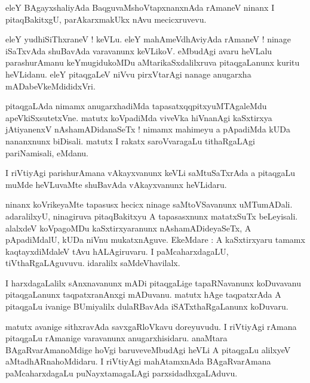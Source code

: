 \documentclass{article}
\begin{document}
\begin{mn}
eleY BAgayxshaliyAda BaqguvaMshoVtapxnanxnAda rAmaneV ninanx I pitaqBakitxgU, parAkarxmakUkx nAvu
mecicxruvevu.
\end{mn}

\begin{mn}
eleY yudhiSiThxraneV ! keVLu. eleY mahAmeVdhAviyAda rAmaneV ! ninage iSaTxvAda shuBavAda 
varavanunx keVLikoV. eMbudAgi avaru heVLalu parashurAmanu keYmugidukoMDu aMtarikaSxdalilxruva 
pitaqgaLanunx kuritu heVLidanu. eleY pitaqgaLeV niVvu pirxVtarAgi nanage anugarxha 
mADabeVkeMdididxVri.
\end{mn}

\begin{mn}
pitaqgaLAda nimamx anugarxhadiMda tapasatxqqpitxyuMTAgaleMdu apeVkiSxsutetxVne. 
matutx koVpadiMda viveVka  hiVnanAgi kaSxtirxya jAtiyanenxV 
nAshamADidanaSeTx ! nimamx mahimeyu a pApadiMda kUDa nananxnunx biDisali. matutx I rakatx 
saroVvaragaLu tithaRgaLAgi pariNamisali, eMdanu.
\end{mn}

\begin{mn}
I riVtiyAgi parishurAmana vAkayxvanunx keVLi saMtuSaTxrAda a pitaqgaLu muMde heVLuvaMte shuBavAda 
vAkayxvanunx heVLidaru.
\end{mn}

\begin{mn}
ninanx koVrikeyaMte tapasusx hecicx ninage saMtoVSavanunx uMTumADali. adaralilxyU, ninagiruva 
pitaqBakitxyu A tapasasxnunx matatxSuTx beLeyisali. alalxdeV koVpagoMDu kaSxtirxyaranunx 
nAshamADideyaSeTx, A pApadiMdalU, kUDa niVnu mukatxnAguve. EkeMdare : A kaSxtirxyaru tamamx 
kaqtayxdiMdaleV tAvu hALAgiruvaru. I paMcaharxdagaLU, tiVthaRgaLAguvuvu. idaralilx  saMdeVhavilalx.
\end{mn}

\begin{mn}
I harxdagaLalilx sAnxnavanunx mADi pitaqgaLige tapaRNavanunx  koDuvavanu pitaqgaLanunx 
taqpatxranAnxgi mADuvanu. matutx hAge taqpatxrAda A pitaqgaLu ivanige BUmiyalilx dulaRBavAda 
iSATxthaRgaLanunx  koDuvaru.
\end{mn}

\begin{mn}
matutx avanige sithxravAda savxgaRloVkavu doreyuvudu. I riVtiyAgi rAmana pitaqgaLu rAmanige 
varavanunx anugarxhisidaru. anaMtara BAgaRvarAmanoMdige hoVgi baruveveMbudAgi heVLi A pitaqgaLu
alilxyeV aMtadhARnahoMdidaru. I riVtiyAgi mahAtamxnAda BAgaRvarAmana paMcaharxdagaLu 
puNayxtamagaLAgi parxsidadhxgaLAduvu.
\end{mn}
\end{document}
